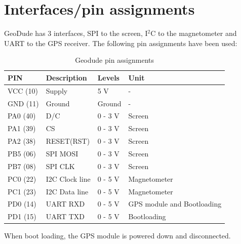 \section{Interfaces/pin assignments}
GeoDude has 3 interfaces, SPI to the screen, I$^2$C to the magnetometer and UART to the GPS receiver.
The following pin assignments have been used:
\begin{table}[H]
\centering
    \begin{tabular}{|l|l|l|l|}
    \hline
    PIN 		& Description    & Levels 	& Unit  \\ \hline
    VCC (10) 	& Supply         & 5 V    	& -		\\ \hline
    GND (11) 	& Ground         & Ground  	& -		\\ \hline
    PA0 (40)	& D/C			 & 0 - 3 V	& Screen \\ \hline
    PA1 (39)	& CS			 & 0 - 3 V  & Screen \\ \hline
    PA2 (38)	& RESET(RST)	 & 0 - 3 V  & Screen \\ \hline
    PB5	(06)	& SPI MOSI		 & 0 - 3 V  & Screen \\ \hline
    PB7 (08)	& SPI CLK		 & 0 - 3 V  & Screen \\ \hline
    PC0 (22) 	& I2C Clock line & 0 - 5 V 	& Magnetometer 	\\ \hline
    PC1 (23) 	& I2C Data line  & 0 - 5 V 	& Magnetometer		\\ \hline
    PD0 (14)	& UART RXD		 & 0 - 5 V	& GPS module and Bootloading \\ \hline
    PD1 (15)    & UART TXD		 & 0 - 5 V  & Bootloading \\ \hline
    \end{tabular}
    \caption{Geodude pin assignments}
\end{table}
When boot loading, the GPS module is powered down and disconnected.


